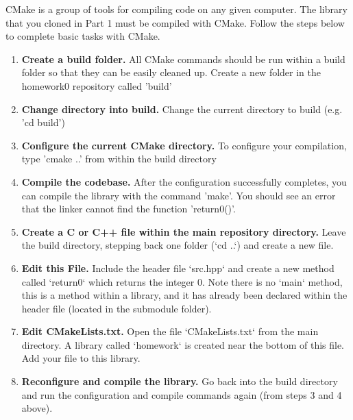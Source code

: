 \documentclass{article} %
\begin{document}
CMake is a group of tools for compiling code on any given computer.  The library that you cloned in Part 1 must be compiled with CMake.  Follow the steps below to complete basic tasks with CMake.

\begin{enumerate}
    \item \textbf{Create a build folder.}  All CMake commands should be run within a build folder so that they can be easily cleaned up.  Create a new folder in the homework0 repository called 'build'

    \item \textbf{Change directory into build.}  Change the current directory to build (e.g. 'cd build')

    \item \textbf{Configure the current CMake directory.}  To configure your compilation, type 'cmake ..' from within the build directory
    

    \item \textbf{Compile the codebase.} After the configuration successfully completes, you can compile the library with the command 'make'.  You should see an error that the linker cannot find the function 'return0()'.

    \item \textbf{Create a C or C++ file within the main repository directory.}  Leave the build directory, stepping back one folder (`cd ..`) and create a new file.  

    \item \textbf{Edit this File.}  Include the header file `src.hpp` and create a new method called `return0` which returns the integer 0.  Note there is no `main` method, this is a method within a library, and it has already been declared within the header file (located in the submodule folder).

    \item \textbf{Edit CMakeLists.txt.}  Open the file `CMakeLists.txt` from the main directory.  A library called `homework` is created near the bottom of this file.  Add your file to this library.

    \item \textbf{Reconfigure and compile the library.}  Go back into the build directory and run the configuration and compile commands again (from steps 3 and 4 above).
\end{enumerate}
\end{document}
